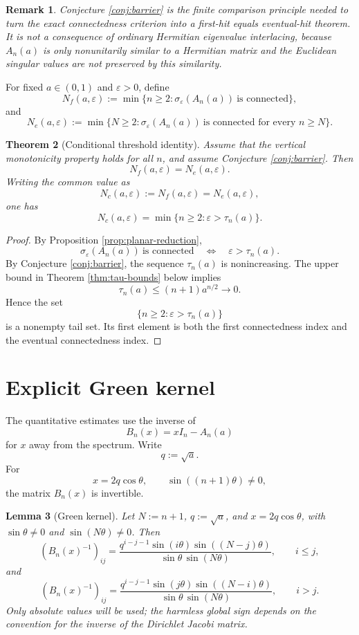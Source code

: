\documentclass[11pt]{amsart}
\numberwithin{equation}{section}
\newcommand{\eps}{\varepsilon}
\newtheorem{theorem}{Theorem}[section]
\newtheorem{lemma}[theorem]{Lemma}
\newtheorem{remark}[theorem]{Remark}
\begin{document}
\begin{remark}
Conjecture \ref{conj:barrier} is the finite comparison principle needed to turn the exact connectedness criterion into a first-hit equals eventual-hit theorem.  It is not a consequence of ordinary Hermitian eigenvalue interlacing, because \(A_n(a)\) is only nonunitarily similar to a Hermitian matrix and the Euclidean singular values are not preserved by this similarity.
\end{remark}

For fixed \(a\in(0,1)\) and \(\eps>0\), define
\[
N_f(a,\eps)
:=
\min\{n\ge2:\sigma_\eps(A_n(a))\ \text{is connected}\},
\]
and
\[
N_e(a,\eps)
:=
\min\{N\ge2:\sigma_\eps(A_n(a))\ \text{is connected for every }n\ge N\}.
\]

\begin{theorem}[Conditional threshold identity]\label{thm:conditional-threshold}
Assume that the vertical monotonicity property holds for all \(n\), and assume Conjecture \ref{conj:barrier}.  Then
\[
N_f(a,\eps)=N_e(a,\eps).
\]
Writing the common value as
\[
N_c(a,\eps):=N_f(a,\eps)=N_e(a,\eps),
\]
one has
\[
N_c(a,\eps)
=
\min\{n\ge2:\eps>\tau_n(a)\}.
\]
\end{theorem}

\begin{proof}
By Proposition \ref{prop:planar-reduction},
\[
\sigma_\eps(A_n(a))\ \text{is connected}
\quad\Longleftrightarrow\quad
\eps>\tau_n(a).
\]
By Conjecture \ref{conj:barrier}, the sequence \(\tau_n(a)\) is nonincreasing.  The upper bound in Theorem \ref{thm:tau-bounds} below implies
\[
\tau_n(a)\le(n+1)a^{n/2}\to0.
\]
Hence the set
\[
\{n\ge2:\eps>\tau_n(a)\}
\]
is a nonempty tail set.  Its first element is both the first connectedness index and the eventual connectedness index.
\end{proof}

\section{Explicit Green kernel}

The quantitative estimates use the inverse of
\[
B_n(x)=xI_n-A_n(a)
\]
for \(x\) away from the spectrum.  Write
\[
q:=\sqrt a.
\]
For
\[
x=2q\cos\theta,
\qquad
\sin((n+1)\theta)\ne0,
\]
the matrix \(B_n(x)\) is invertible.

\begin{lemma}[Green kernel]\label{lem:green}
Let \(N:=n+1\), \(q:=\sqrt a\), and \(x=2q\cos\theta\), with \(\sin\theta\ne0\) and \(\sin(N\theta)\ne0\).  Then
\[
(B_n(x)^{-1})_{ij}
=
\frac{
q^{i-j-1}\sin(i\theta)\sin((N-j)\theta)
}{
\sin\theta\,\sin(N\theta)
},
\qquad i\le j,
\]
and
\[
(B_n(x)^{-1})_{ij}
=
\frac{
q^{i-j-1}\sin(j\theta)\sin((N-i)\theta)
}{
\sin\theta\,\sin(N\theta)
},
\qquad i>j.
\]
Only absolute values will be used; the harmless global sign depends on the convention for the inverse of the Dirichlet Jacobi matrix.
\end{lemma}
\end{document}
